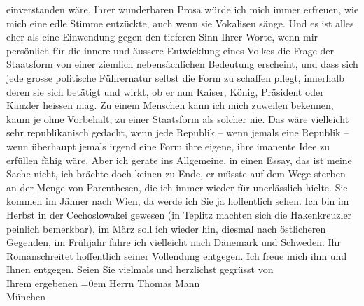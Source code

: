 \begin{ledgroupsized}[t]{13cm}
               einverstanden wäre, Ihrer wunderbaren Prosa würde ich mich immer erfreuen, wie mich
               eine {\pb}edle Stimme entzückte, auch wenn sie Vokalisen
               sänge. Und es ist alles eher als eine Einwendung gegen den tieferen Sinn Ihrer Worte,
               wenn mir persönlich für die innere und äussere Entwicklung eines Volkes die Frage der
               Staatsform von einer ziemlich nebensächlichen Bedeutung erscheint, und dass sich jede
               grosse politische Führernatur selbst die Form zu schaffen pflegt, innerhalb deren sie
               sich betätigt und wirkt, ob er nun Kaiser, König, Präsident oder Kanzler heissen mag.
               Zu einem Menschen kann ich mich zuweilen bekennen, kaum je ohne Vorbehalt, zu einer
               Staatsform als solcher nie. Das wäre vielleicht sehr republikanisch gedacht, wenn
               jede Republik – wenn jemals eine Republik – wenn überhaupt jemals irgend eine Form
               ihre eigene, ihre imanente Idee zu erfüllen fähig wäre. Aber ich gerate
               ins Allgemeine, in einen Essay, das ist meine Sache nicht, ich brächte doch keinen zu
               Ende, er müsste auf dem Wege sterben an der Menge von Parenthesen, die ich immer
               wieder für unerlässlich hielte.\pend
           \pstart
           Sie kommen im Jänner nach Wien, da werde
               ich Sie ja hoffentlich sehen. Ich bin im Herbst in der Cechoslowakei gewesen (in Teplitz machten sich die Hakenkreuzler peinlich bemerkbar), im
                  März{ }soll ich wieder hin, diesmal nach östlicheren
               Gegenden, im Frühjahr fahre ich vielleicht nach Dänemark und Schweden. Ihr Romanschreitet hoffentlich seiner Vollendung entgegen.
               Ich freue mich ihm und Ihnen entgegen.\pend
           \pstart
           Seien Sie vielmals und herzlichst gegrüsst von{\\[\baselineskip]}Ihrem ergebenen\pend
           \leftskip=0em{}{\bigskip}\pstart
           \noindent{}Herrn Thomas Mann{\\}\pend
           \pstart
           München\pend
           \endnumbering{}\end{ledgroupsized}  \newcommand{\dateiname}{L02394}\newcommand{\titel}{Arthur Schnitzler an Thomas Mann, 28. 12. 1922}\newcommand{\editorInnen}{Martin Anton Müller und Gerd-Hermann Susen}
            \footnotesize
\begin{ledgroupsized}[t]{11.5cm}
\end{ledgroupsized}
         
      